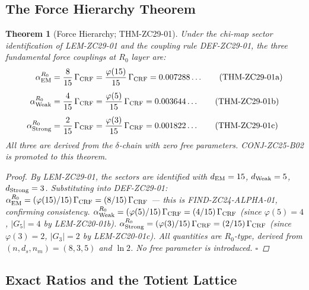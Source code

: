 \documentclass[12pt, a4paper]{article}
\newtheorem{theorem}{Theorem}[section]
\begin{document}
\subsection{The Force Hierarchy Theorem}
\label{zc29:sec:theorem}

\begin{theorem}[Force Hierarchy; THM-ZC29-01]
\label{zc29:thm:hierarchy}
Under the chi-map sector identification of LEM-ZC29-01 and the
coupling rule DEF-ZC29-01, the three fundamental force couplings
at $R_0$ layer are:
\begin{align}
  \alpha_{\rm EM}^{R_0}
    &= \frac{8}{15}\,\Gamma_{\rm CRF}
     = \frac{\varphi(15)}{15}\,\Gamma_{\rm CRF}
     = 0.007288\ldots
     \tag{THM-ZC29-01a}\label{zc29:eq:aEM}\\[4pt]
  \alpha_{\rm Weak}^{R_0}
    &= \frac{4}{15}\,\Gamma_{\rm CRF}
     = \frac{\varphi(5)}{15}\,\Gamma_{\rm CRF}
     = 0.003644\ldots
     \tag{THM-ZC29-01b}\label{zc29:eq:aW}\\[4pt]
  \alpha_{\rm Strong}^{R_0}
    &= \frac{2}{15}\,\Gamma_{\rm CRF}
     = \frac{\varphi(3)}{15}\,\Gamma_{\rm CRF}
     = 0.001822\ldots
     \tag{THM-ZC29-01c}\label{zc29:eq:aS}
\end{align}
All three are derived from the $\delta$-chain with zero free
parameters.
CONJ-ZC25-B02 is promoted to this theorem.

\begin{proof}
By LEM-ZC29-01, the sectors are identified with
$d_{\rm EM}=15$, $d_{\rm Weak}=5$, $d_{\rm Strong}=3$.
Substituting into DEF-ZC29-01:
$\alpha_{\rm EM}^{R_0}
  = (\varphi(15)/15)\,\Gamma_{\rm CRF}
  = (8/15)\,\Gamma_{\rm CRF}$ --- this is FIND-ZC24-ALPHA-01,
confirming consistency.
$\alpha_{\rm Weak}^{R_0}
  = (\varphi(5)/15)\,\Gamma_{\rm CRF}
  = (4/15)\,\Gamma_{\rm CRF}$
(since $\varphi(5)=4$, $|G_5|=4$ by LEM-ZC20-01b).
$\alpha_{\rm Strong}^{R_0}
  = (\varphi(3)/15)\,\Gamma_{\rm CRF}
  = (2/15)\,\Gamma_{\rm CRF}$
(since $\varphi(3)=2$, $|G_3|=2$ by LEM-ZC20-01c).
All quantities are $R_0$-type, derived from $(n,d_s,n_m)=(8,3,5)$
and $\ln 2$.
No free parameter is introduced.
\hfill$\square$
\end{proof}
\end{theorem}

\subsection{Exact Ratios and the Totient Lattice}
\label{zc29:sec:ratios}
\end{document}
